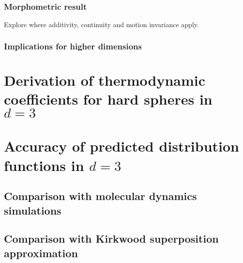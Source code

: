 \documentclass[12pt]{report}
\begin{document}
\subsubsection{Morphometric result}
Explore where additivity, continuity and motion invariance apply.
\subsubsection{Implications for higher dimensions}

\section{Derivation of thermodynamic coefficients for hard spheres in $d = 3$}

\section{Accuracy of predicted distribution functions in $d = 3$}
\subsection{Comparison with molecular dynamics simulations}
\subsection{Comparison with Kirkwood superposition approximation}
\end{document}
